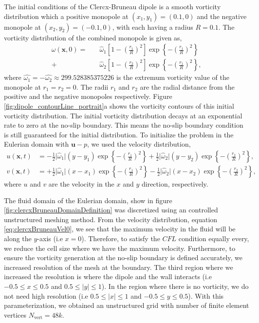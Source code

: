 The initial conditions of the Clercx-Bruneau dipole is a smooth vorticity distribution which a positive monopole at $(x_1,y_1)=(0.1,0)$ and the negative monopole at $(x_2,y_2)=(-0.1,0)$, with each having a radius $R = 0.1$. The vorticity distribution of the combined monopole is given as,
	\begin{equation}
	\begin{split}
	\omega(\mathbf{x},0) = \quad &\hat{\omega}_1\left[1-\left(\frac{r_1}{R}\right)^2\right]\exp\left\{-\left(\frac{r_1}{R}\right)^2\right\} \\
	+\ &\hat{\omega}_2\left[1-\left(\frac{r_2}{R}\right)^2\right]\exp\left\{-\left(\frac{r_1}{R}\right)^2\right\} ,
	\end{split}
	\label{eq:clercxBruneauOmega0}
	\end{equation}
where $\hat{\omega_1} = - \hat{\omega_2} \approx 299.528385375226$ is the extremum vorticity value of the monopole at $r_1=r_2=0$. The radii $r_1$ and $r_2$ are the radial distance from the positive and the negative monopoles respectively. Figure \ref{fig:dipole_contourLine_portrait}a shows the vorticity contours of this initial vorticity distribution. The initial vorticity distribution decays at an exponential rate to zero at the no-slip boundary. This means the no-slip boundary condition is still guaranteed for the initial distribution. To initialize the problem in the Eulerian domain with $\mathbf{u}-p$, we used the velocity distribution, 
	\begin{subequations}
	\begin{align}
	u(\mathbf{x},t) & = -\frac{1}{2}\lvert\hat{\omega}_1\rvert(y-y_1)\exp\left\{-\left(\frac{r_1}{R}\right)^2\right\} + \frac{1}{2}\lvert\hat{\omega}_2\rvert(y-y_2)\exp\left\{-\left(\frac{r_2}{R}\right)^2\right\}, \\
	v(\mathbf{x},t) & = +\frac{1}{2}\lvert\hat{\omega}_1\rvert(x-x_1)\exp\left\{-\left(\frac{r_1}{R}\right)^2\right\} - \frac{1}{2}\lvert\hat{\omega}_2\rvert(x-x_2)\exp\left\{-\left(\frac{r_2}{R}\right)^2\right\},
	\end{align}
	\label{eq:clercxBruneauVel0}
	\end{subequations}
where $u$ and $v$ are the velocity in the $x$ and $y$ direction, respectively. 

The fluid domain of the Eulerian domain, show in figure \ref{fig:clercxBruneauDomainDefinition} was discretized using an controlled unstructured meshing method. From the velocity distribution, equation \ref{eq:clercxBruneauVel0}, we see that the maximum velocity in the fluid will be along the $y$-axis (i.e $x=0$). Therefore, to satisfy the $CFL$ condition equally every, we reduce the cell size where we have the maximum velocity. Furthermore, to ensure the vorticity generation at the no-slip boundary is defined accurately, we increased resolution of the mesh at the boundary. The third region where we increased the resolution is where the dipole and the wall interacts (i.e $-0.5\le{x}\le0.5$ and $0.5\le{\left|y\right|}\le1$). In the region where there is no vorticity, we do not need high resolution (i.e $0.5\le{\left|x\right|}\le1$ and $-0.5\le{y}\le0.5$). With this parameterization, we obtained an unstructured grid with number of finite element vertices $N_{\mathrm{vert}}=48k$. 

